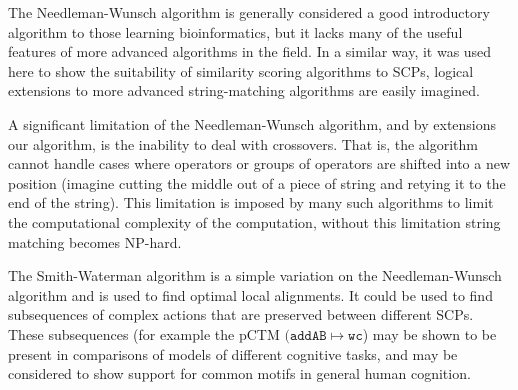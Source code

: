 The Needleman-Wunsch algorithm is generally considered a good introductory algorithm to those learning bioinformatics, but it lacks many of the useful features of more advanced algorithms in the field. In a similar way, it was used here to show the suitability of similarity scoring algorithms to SCPs, logical extensions to more advanced string-matching algorithms are easily imagined.

A significant limitation of the Needleman-Wunsch algorithm, and by extensions our algorithm, is the inability to deal with crossovers. That is, the algorithm cannot handle cases where operators or groups of operators are shifted into a new position (imagine cutting the middle out of a piece of string and retying it to the end of the string). This limitation is imposed by many such algorithms to limit the computational complexity of the computation, without this limitation string matching becomes NP-hard.

The Smith-Waterman algorithm \citep{smith1981identification} is a simple variation on the Needleman-Wunsch algorithm and is used to  find optimal local alignments. It could be used to find subsequences of complex actions that are preserved between different SCPs. These subsequences (for example the pCTM $(\texttt{addAB} \longmapsto \texttt{wc}$) may be shown to be present in comparisons of models of different cognitive tasks, and may be considered to show support for common motifs in general human cognition.

